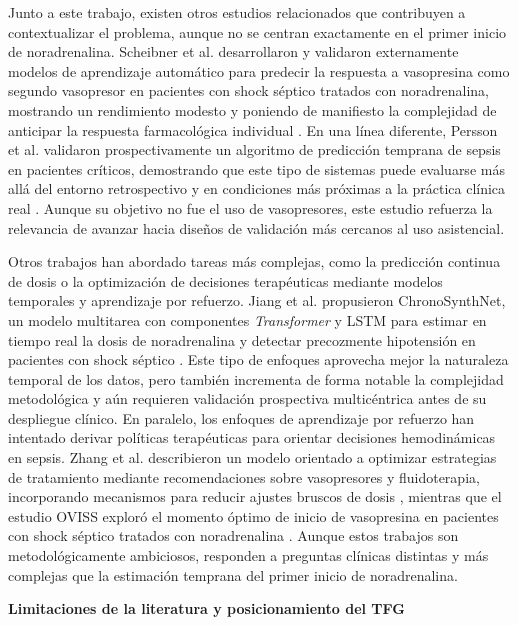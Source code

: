 Junto a este trabajo, existen otros estudios relacionados que contribuyen a contextualizar el problema, aunque no se centran exactamente en el primer inicio de noradrenalina. Scheibner et al. desarrollaron y validaron externamente modelos de aprendizaje automático para predecir la respuesta a vasopresina como segundo vasopresor en pacientes con shock séptico tratados con noradrenalina, mostrando un rendimiento modesto y poniendo de manifiesto la complejidad de anticipar la respuesta farmacológica individual \cite{scheibner2022}. En una línea diferente, Persson et al. validaron prospectivamente un algoritmo de predicción temprana de sepsis en pacientes críticos, demostrando que este tipo de sistemas puede evaluarse más allá del entorno retrospectivo y en condiciones más próximas a la práctica clínica real \cite{persson2024}. Aunque su objetivo no fue el uso de vasopresores, este estudio refuerza la relevancia de avanzar hacia diseños de validación más cercanos al uso asistencial.

Otros trabajos han abordado tareas más complejas, como la predicción continua de dosis o la optimización de decisiones terapéuticas mediante modelos temporales y aprendizaje por refuerzo. Jiang et al. propusieron ChronoSynthNet, un modelo multitarea con componentes \textit{Transformer} y LSTM para estimar en tiempo real la dosis de noradrenalina y detectar precozmente hipotensión en pacientes con shock séptico \cite{jiang2025}. Este tipo de enfoques aprovecha mejor la naturaleza temporal de los datos, pero también incrementa de forma notable la complejidad metodológica y aún requieren validación prospectiva multicéntrica antes de su despliegue clínico. En paralelo, los enfoques de aprendizaje por refuerzo han intentado derivar políticas terapéuticas para orientar decisiones hemodinámicas en sepsis. Zhang et al. describieron un modelo orientado a optimizar estrategias de tratamiento mediante recomendaciones sobre vasopresores y fluidoterapia, incorporando mecanismos para reducir ajustes bruscos de dosis \cite{zhang2024}, mientras que el estudio OVISS exploró el momento óptimo de inicio de vasopresina en pacientes con shock séptico tratados con noradrenalina \cite{jama2025}. Aunque estos trabajos son metodológicamente ambiciosos, responden a preguntas clínicas distintas y más complejas que la estimación temprana del primer inicio de noradrenalina.

\textbf{Limitaciones de la literatura y posicionamiento del TFG}


